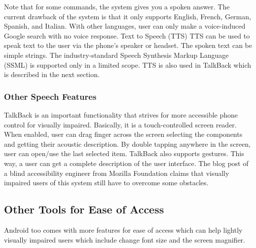 Note that for some commands, the system gives you a spoken answer. The current drawback of the system is that it only supports English, French, German, Spanish, and Italian. With other languages, user can only make a voice-induced Google search with no voice response.
Text to Speech (TTS)
TTS can be used to speak text to the user via the phone's speaker or headset. The spoken text can be simple strings. The industry-standard Speech Synthesis Markup Language (SSML) is supported only in a limited scope. TTS is also used in TalkBack which is described in the next section.
\subsubsection{Other Speech Features}
TalkBack is an important functionality that strives for more accessible phone control for visually impaired. Basically, it is a touch-controlled screen reader. When enabled, user can drag finger across the screen selecting the components and getting their acoustic description. By double tapping anywhere in the screen, user can open/use the last selected item. TalkBack also supports gestures. This way, a user can get a complete description of the user interface. The blog post of a blind accessibility engineer from Mozilla Foundation \cite{mozillaguy} claims that visually impaired users of this system still have to overcome some obstacles.

\subsection{Other Tools for Ease of Access}
Android too comes with more features for ease of access which can help lightly visually impaired users which include change font size and the screen magnifier.

\endinput
